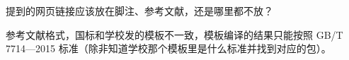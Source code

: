 

\begin{appendix}

    \begingroup
    \renewcommand{\clearpage}{\relax}
    \listoftodos
    提到的网页链接应该放在脚注、参考文献，还是哪里都不放？

    参考文献格式，国标和学校发的模板不一致，模板编译的结果只能按照 GB/T 7714—2015 标准（除非知道学校那个模板里是什么标准并找到对应的包）。
    \endgroup

    \listoffigures
    \listoffigureEng

\end{appendix}
